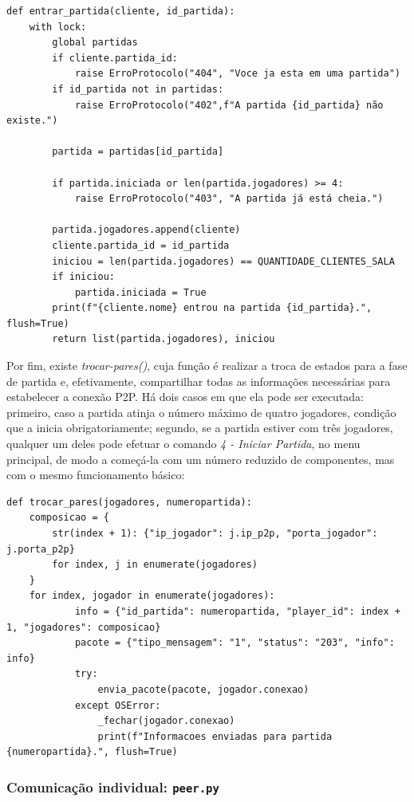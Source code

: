 \documentclass[11pt,a4paper]{article}
\begin{document}
\begin{verbatim}
def entrar_partida(cliente, id_partida):
    with lock:
        global partidas  
        if cliente.partida_id:
            raise ErroProtocolo("404", "Voce ja esta em uma partida")
        if id_partida not in partidas:
            raise ErroProtocolo("402",f"A partida {id_partida} não existe.")
        
        partida = partidas[id_partida]
            
        if partida.iniciada or len(partida.jogadores) >= 4:
            raise ErroProtocolo("403", "A partida já está cheia.")
                
        partida.jogadores.append(cliente)
        cliente.partida_id = id_partida
        iniciou = len(partida.jogadores) == QUANTIDADE_CLIENTES_SALA
        if iniciou:
            partida.iniciada = True
        print(f"{cliente.nome} entrou na partida {id_partida}.", flush=True)
        return list(partida.jogadores), iniciou
\end{verbatim}

Por fim, existe \textit{trocar-pares()}, cuja função é realizar a troca de estados para a fase de partida e, efetivamente, compartilhar todas as informações necessárias para estabelecer a conexão P2P. Há dois casos em que ela pode ser executada: primeiro, caso a partida atinja o número máximo de quatro jogadores, condição que a inicia obrigatoriamente; segundo, se a partida estiver com três jogadores, qualquer um deles pode efetuar o comando \textit{4 - Iniciar Partida}, no menu principal, de modo a começá-la com um número reduzido de componentes, mas com o mesmo funcionamento básico:

\begin{verbatim}
def trocar_pares(jogadores, numeropartida):
    composicao = {
        str(index + 1): {"ip_jogador": j.ip_p2p, "porta_jogador": j.porta_p2p}
        for index, j in enumerate(jogadores)
    }
    for index, jogador in enumerate(jogadores):
            info = {"id_partida": numeropartida, "player_id": index + 1, "jogadores": composicao}
            pacote = {"tipo_mensagem": "1", "status": "203", "info": info}
            try:
                envia_pacote(pacote, jogador.conexao)
            except OSError:
                _fechar(jogador.conexao)
                print(f"Informacoes enviadas para partida {numeropartida}.", flush=True)
\end{verbatim}


\subsubsection{Comunicação individual: \texttt{peer.py}}
\label{sec:implementacao-peer}
\end{document}

